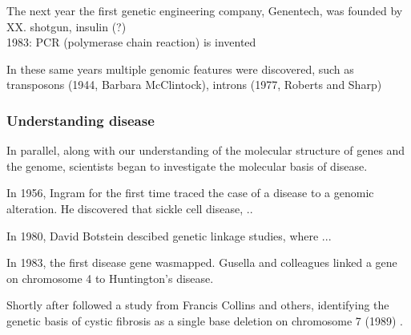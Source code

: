 
The next year the first genetic engineering company, Genentech, was founded by XX. shotgun, insulin (?)\\


1983: PCR (polymerase chain reaction) is invented 


In these same years multiple genomic features were discovered, such as transposons (1944, Barbara McClintock), introns (1977, Roberts and Sharp)


\subsubsection{Understanding disease}

In parallel, along with our understanding of the molecular structure of genes and the genome, scientists began to investigate the molecular basis of disease.



In 1956, Ingram for the first time traced the case of a disease to a genomic alteration.
He discovered that sickle cell disease, ..



In 1980, David Botstein descibed genetic linkage studies, where ... \cite{botstein1980construction}

In 1983, the first disease gene  wasmapped.
Gusella and colleagues linked a gene on chromosome 4 to Huntington's disease. \cite{gusella1983polymorphic}

Shortly after followed a study from Francis Collins and others, identifying the genetic basis of cystic fibrosis as a single base deletion on chromosome 7 (1989)  \cite{riordan1989identification}.

